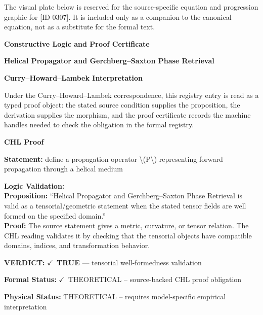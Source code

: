 \begingroup\footnotesize\sloppy
The visual plate below is reserved for the source-specific equation and progression graphic for [ID 0307]. It is included only as a companion to the canonical equation, not as a substitute for the formal text.
\par\endgroup
\ifTZPDarkEdition
{}
\fi

\clearpage
\begingroup\tzpsupportsetup
\noindent\textbf{\fontsize{10.8pt}{12.8pt}\selectfont [ID 0307] Constructive Logic and Proof Certificate}\par
\noindent\textbf{\fontsize{10pt}{12pt}\selectfont Helical Propagator and Gerchberg--Saxton Phase Retrieval}\par
\vspace{0.45em}
\begingroup
\footnotesize
\setlength{\parskip}{0.22em}
\setlength{\parindent}{0pt}
\noindent\textbf{Curry--Howard--Lambek Interpretation}\par
Under the Curry--Howard--Lambek correspondence, this registry entry is read as a typed proof
object: the stated source condition supplies the proposition, the derivation supplies the
morphism, and the proof certificate records the machine handles needed to check the obligation
in the formal registry.

\vspace{0.45em}
\noindent\textbf{CHL Proof}\par
\textbf{Statement:} define a propagation operator \textbackslash{}(P\textbackslash{}) representing forward propagation through a helical
medium

\textbf{Logic Validation:}\\
\textbf{Proposition:} ``Helical Propagator and Gerchberg--Saxton Phase Retrieval is valid as a
tensorial/geometric statement when the stated tensor fields are well formed on the
specified domain.''\\
\textbf{Proof:} The source statement gives a metric, curvature, or tensor relation. The CHL reading
validates it by checking that the tensorial objects have compatible domains, indices,
and transformation behavior.

\textbf{VERDICT:} \ensuremath{\checkmark}\ \textbf{TRUE} --- tensorial well-formedness validation

\textbf{Formal Status:} \ensuremath{\checkmark}\ THEORETICAL -- source-backed CHL proof obligation

\textbf{Physical Status:} THEORETICAL -- requires model-specific empirical interpretation
\par\vspace{0.45em}
\par
\ifTZPDarkEdition
{}
\fi
\endgroup
\endgroup

